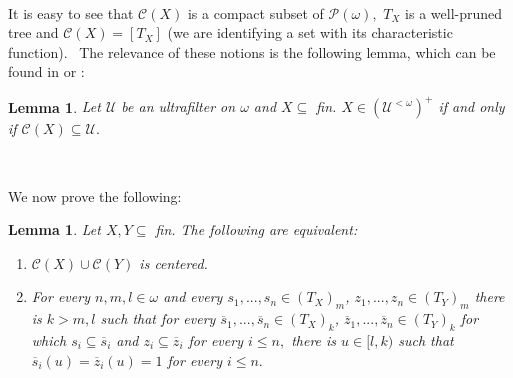 \documentclass{article}%
\newtheorem{lemma}[theorem]{Lemma}
\begin{document}
\qquad\ \ 

It is easy to see that $\mathcal{C}\left(  X\right)  $ is a compact subset of
$\mathcal{P}\left(  \omega\right)  ,$ $T_{X}$ is a well-pruned tree and
$\mathcal{C}\left(  X\right)  =\left[  T_{X}\right]  $ (we are identifying a
set with its characteristic function). \ The relevance of these notions is the
following lemma, which can be found in \cite{uanda} or \cite{CanjarFiltersII}:

\begin{lemma}
Let $\mathcal{U}$ be an ultrafilter on $\omega$ and $X\subseteq$ \textsf{fin.
}$X\in\left(  \mathcal{U}^{<\omega}\right)  ^{+}$ if and only if
$\mathcal{C}\left(  X\right)  \subseteq\mathcal{U}.$
\label{Lema positivo ultrafiltro}
\end{lemma}

\qquad\ \ \ \ \ 

We now prove the following:

\begin{lemma}
Let $X,Y\subseteq$ \textsf{fin. }The following are equivalent:

\begin{enumerate}
\item $\mathcal{C}\left(  X\right)  \cup\mathcal{C}\left(  Y\right)  $ is centered.

\item For every $n,m,l\in\omega$ and every $s_{1},...,s_{n}\in\left(
T_{X}\right)  _{m}$, $z_{1},...,z_{n}\in\left(  T_{Y}\right)  _{m}$ there is
$k>m,l$ such that for every $\overline{s}_{1},...,\overline{s}_{n}\in\left(
T_{X}\right)  _{k}$, $\overline{z}_{1},...,\overline{z}_{n}\in\left(
T_{Y}\right)  _{k}$ for which $s_{i}\subseteq\overline{s}_{i}$ and
$z_{i}\subseteq\overline{z}_{i}$ for every $i\leq n,$ there is $u\in\lbrack
l,k)$ such that $\overline{s}_{i}\left(  u\right)  =\overline{z}_{i}\left(
u\right)  =1$ for every $i\leq n.$
\end{enumerate}
\end{lemma}
\end{document}
